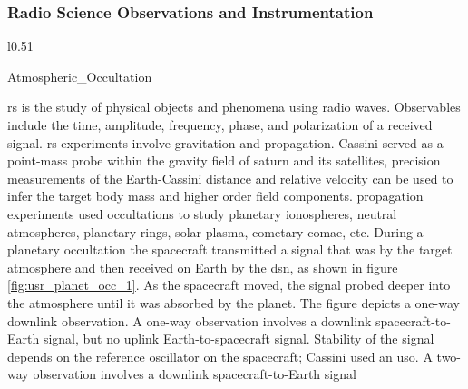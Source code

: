 \documentclass[crop=false,class=article,oneside]{standalone}
\begin{document}
        \subsubsection{Radio Science Observations
                       and Instrumentation}
            \label{subsubsec:usr_rad_sci_obs_and_inst}
            \begin{wrapfigure}[11]{l}{0.51\textwidth}
                \centering
                \captionsetup{type=figure}
                
                          {Atmospheric_Occultation}
                \caption{Refraction via an 
                         Atmospheric Occultation}
                \label{fig:usr_planet_occ_1}
            \end{wrapfigure}
            \gls{rs} is the study of physical objects and
            phenomena using \gls{radio waves}.
            Observables include the time, \gls{amplitude},
            \gls{frequency}, \gls{phase}, and
            \gls{polarization} of a received signal.
            \gls{rs} experiments involve \gls{gravitation}
            and \gls{propagation}. Cassini served as a
            point-mass probe within the gravity field
            of \gls{saturn} and its satellites, precision
            measurements of the Earth-Cassini distance
            and \gls{relative velocity} can be used to
            infer the target body mass and higher order
            field components. \Gls{propagation} experiments
            used \glspl{occultation} to study planetary
            \glspl{ionosphere}, \glspl{neutral atmosphere},
            \gls{planetary rings}, \gls{solar plasma},
            \gls{cometary comae}, etc. During a planetary
            \gls{occultation} the spacecraft transmitted
            a signal that was
             by the
            target atmosphere and then received on Earth
            by the \gls{dsn}, as shown in figure
            \ref{fig:usr_planet_occ_1}. As the spacecraft
            moved, the signal probed deeper into the
            atmosphere until it was absorbed by the planet.
            The figure depicts a one-way \gls{downlink}
            observation. A \gls{one-way observation}
            involves a \gls{downlink} spacecraft-to-Earth
            signal, but no \gls{uplink} Earth-to-spacecraft
            signal. Stability of the signal depends on the
            reference \gls{oscillator} on the spacecraft;
            Cassini used an \gls{uso}.
            A \gls{two-way observation} involves a
            \gls{downlink} spacecraft-to-Earth signal
\end{document}
